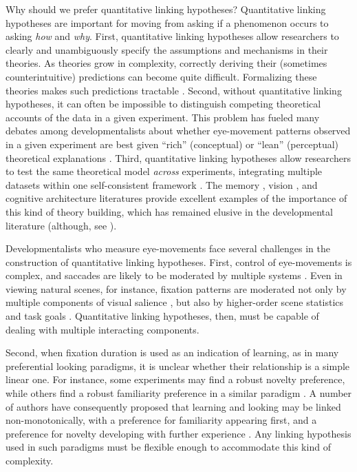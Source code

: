 \documentclass[12pt]{article}
\begin{document}
	Why should we prefer quantitative linking hypotheses? Quantitative linking hypotheses are important for moving from asking if a phenomenon occurs to asking \emph{how} and \emph{why}. First, quantitative linking hypotheses allow researchers to clearly and unambiguously specify the assumptions and mechanisms in their theories. As theories grow in complexity, correctly deriving their (sometimes counterintuitive) predictions can become quite difficult. Formalizing these theories makes such predictions tractable \cite{McClelland2009, Shiffrin2010}. Second, without quantitative linking hypotheses, it can often be impossible to distinguish competing theoretical accounts of the data in a given experiment. This problem has fueled many debates among developmentalists about whether eye-movement patterns observed in a given experiment are best given ``rich'' (conceptual) or ``lean'' (perceptual) theoretical explanations \cite{Spelke1998, Aslin2000, Munakata2000}. Third, quantitative linking hypotheses allow researchers to test the same theoretical model \emph{across} experiments, integrating multiple datasets within one self-consistent framework \cite{Aslin2007, Munakata2000,Estes1957, Newell1973}. The memory \cite{Shiffrin1977}, vision \cite{Itti2001}, and cognitive architecture \cite{Anderson1998} literatures provide excellent examples of the importance of this kind of theory building, which has remained elusive in the developmental literature (although, see \cite{Schoner2006}).
	
	Developmentalists who measure eye-movements face several challenges in the construction of quantitative linking hypotheses. First, control of eye-movements is complex, and saccades are likely to be moderated by multiple systems \cite{Aslin2007,  Sirois2004, Hayhoe2005}. Even in viewing natural scenes, for instance, fixation patterns are moderated not only by multiple components of visual salience \cite{Itti2001}, but also by higher-order scene statistics \cite{Torralba2006} and task goals \cite{Hayhoe2005, Castelhano2009}. Quantitative linking hypotheses, then, must be capable of dealing with multiple interacting components.
	
	Second, when fixation duration is used as an indication of learning, as in many preferential looking paradigms, it is unclear whether their relationship is a simple linear one. For instance, some experiments may find a robust novelty preference, while others find a robust familiarity preference in a similar paradigm \cite{Mix2002,Pelucchi2009}. A number of authors have consequently proposed that learning and looking may be linked non-monotonically, with a preference for familiarity appearing first, and a preference for novelty developing with further experience \cite{Hunter1988, Roder2000, Cohen2004, Houston-Price2004}. Any linking hypothesis used in such paradigms must be flexible enough to accommodate this kind of complexity.
	
\end{document}
